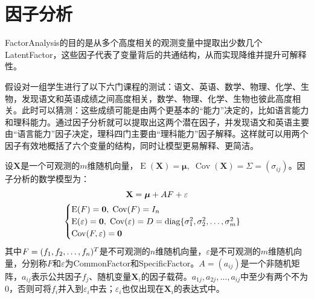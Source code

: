\section{因子分析}
\gls{FactorAnalysis}的目的是从多个高度相关的观测变量中提取出少数几个\gls{LatentFactor}，这些因子代表了变量背后的共通结构，从而实现降维并提升可解释性。\par
假设对一组学生进行了以下六门课程的测试：语文、英语、数学、物理、化学、生物，发现语文和英语成绩之间高度相关，数学、物理、化学、生物也彼此高度相关。此时可以猜测：这些成绩可能是由两个更基本的“能力”决定的，比如语言能力和理科能力。通过因子分析就可以提取出这两个潜在因子，并发现语文和英语主要由“语言能力”因子决定，理科四门主要由“理科能力”因子解释。这样就可以用两个因子有效地概括了六个变量的结构，同时让模型更易解释、更简洁。
\begin{definition}
	设$\mathbf{X}$是一个可观测的$m$维随机向量，$\operatorname{E}(\mathbf{X})=\boldsymbol{\mu},\;\operatorname{Cov}(\mathbf{X})=\Sigma=(\sigma_{ij})$。因子分析的数学模型为：
	\begin{gather*}
		\mathbf{X}=\boldsymbol{\mu}+AF+\varepsilon \\
		\begin{cases}
			\operatorname{E}(F)=\mathbf{0},\;\operatorname{Cov}(F)=I_n \\
			\operatorname{E}(\varepsilon)=\mathbf{0},\;\operatorname{Cov}(\varepsilon)=D=\operatorname{diag}\{\sigma^2_1, \sigma^2_2, \dots, \sigma^2_{m}\} \\
			\operatorname{Cov}(F,\varepsilon)=\mathbf{0}
		\end{cases}
	\end{gather*}
	其中$F=(f_1, f_2, \dots, f_{n})^T$是不可观测的$n$维随机向量，$\varepsilon$是不可观测的$m$维随机向量，分别称$F$和$\varepsilon$为\gls{CommonFactor}和\gls{SpecificFactor}。$A=(a_{ij})$是一个非随机矩阵，$a_{ij}$表示公共因子$f_j$、随机变量$\mathbf{X}_i$的因子载荷。$a_{1j},a_{2j},\dots,a_{ij}$中至少有两个不为$0$，否则可将$f_i$并入到$\varepsilon_i$中去；$\varepsilon_i$也仅出现在$\mathbf{X}_i$的表达式中。
\end{definition}
